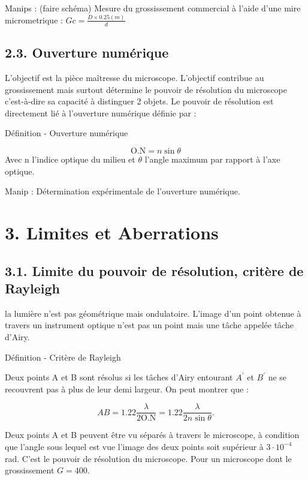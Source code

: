 \documentclass[french, a4paper, 10pt, twocolumn, landscape]{article}
\begin{document}
Manips : (faire schéma) Mesure du grossissement commercial à l'aide d'une mire micrometrique : $Gc = \frac{D\times 0.25 (m)}{d}$

\subsection*{2.3. Ouverture numérique}

L'objectif est la pièce maîtresse du microscope. L'objectif contribue au grossissement mais surtout détermine le pouvoir de résolution du microscope c’est-à-dire sa capacité à distinguer 2 objets. Le pouvoir de résolution est directement lié à l’ouverture numérique définie par :

	\begin{definition}{Définition - Ouverture numérique}

		$$\text{O.N} = n \sin\theta$$
		Avec n l’indice optique du milieu et $\theta$ l’angle maximum par rapport à l’axe optique.

	\end{definition}


Manip : Détermination expérimentale de l’ouverture numérique.


\section*{3. Limites et Aberrations}
\subsection*{3.1. Limite du pouvoir de résolution, critère de Rayleigh}

la lumière n'est pas géométrique mais ondulatoire. L'image d'un point obtenue à travers un instrument optique n'est pas un point mais une tâche appelée tâche d'Airy.


	\begin{definition}{Définition - Critère de Rayleigh}

		Deux points A et B sont résolus si les tâches d'Airy entourant $A^\prime$ et $B^\prime$ ne se recouvrent pas à plus de leur demi largeur. On peut montrer que : 

		$$AB = 1.22\frac{\lambda}{2\text{O.N}} = 1.22\frac{\lambda}{2n \sin\theta}.$$
	\end{definition}

Deux points A et B peuvent être vu séparés à travers le microscope, à condition que l'angle sous lequel est vue l'image des deux points soit supérieur à $3\cdot 10^{-4}$ rad. C'est le pouvoir de résolution du microscope. Pour un microscope dont le grossissement $G = 400$.
\end{document}
